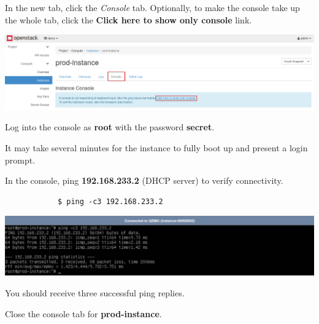 \documentclass[letterpaper, 12pt]{article}
\begin{document}
\begin{enumerate}
    \begin{labstep}
        In the new tab, click the \textit{Console} tab.
        Optionally, to make the console take up the whole tab, click the \textbf{Click here to show only console} link.

        \begin{center}
            \includegraphics[width=\linewidth]{images/part1/step12.png}
        \end{center}
    \end{labstep}

    \begin{labstep}
        Log into the console as \textbf{root} with the password \textbf{secret}.
    \end{labstep}

    \begin{notebox}
        It may take several minutes for the instance to fully boot up and present a login prompt.
    \end{notebox}

    \begin{labstep}
        In the console, ping \textbf{192.168.233.2} (DHCP server) to verify connectivity.
        \begin{lstlisting}
            $ ping -c3 192.168.233.2
        \end{lstlisting}

        \begin{center}
            \includegraphics[width=\linewidth]{images/part1/step14.png}
        \end{center}
    \end{labstep}

    \begin{notebox}
        You should receive three successful ping replies.
    \end{notebox}

    \begin{labstep}
        Close the console tab for \textbf{prod-instance}.
    \end{labstep}


\end{enumerate}
\end{document}

